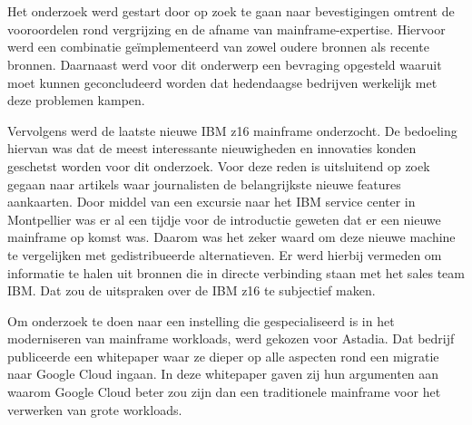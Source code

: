
\chapter{}
\label{ch:methodologie}



\section{}
\label{sec:De literatuur- en vergelijkende studie}

Het onderzoek werd gestart door op zoek te gaan naar bevestigingen omtrent de vooroordelen rond vergrijzing en de afname van mainframe-expertise. Hiervoor werd een combinatie geïmplementeerd van zowel oudere bronnen als recente bronnen. Daarnaast werd voor dit onderwerp een bevraging opgesteld waaruit moet kunnen geconcludeerd worden dat hedendaagse bedrijven werkelijk met deze problemen kampen. 

Vervolgens werd de laatste nieuwe IBM z16 mainframe onderzocht. De bedoeling hiervan was dat de meest interessante nieuwigheden en innovaties konden geschetst worden voor dit onderzoek. Voor deze reden is uitsluitend op zoek gegaan naar artikels waar journalisten de belangrijkste nieuwe features aankaarten. Door middel van een excursie naar het IBM service center in Montpellier was er al een tijdje voor de introductie geweten dat er een nieuwe mainframe op komst was. Daarom was het zeker waard om deze nieuwe machine te vergelijken met gedistribueerde alternatieven. Er werd hierbij vermeden om informatie te halen uit bronnen die in directe verbinding staan met het sales team IBM. Dat zou de uitspraken over de IBM z16 te subjectief maken. 

Om onderzoek te doen naar een instelling die gespecialiseerd is in het moderniseren van mainframe workloads, werd gekozen voor Astadia. Dat bedrijf publiceerde een whitepaper waar ze dieper op alle aspecten rond een migratie naar Google Cloud ingaan. In deze whitepaper gaven zij hun argumenten aan waarom Google Cloud beter zou zijn dan een traditionele mainframe voor het verwerken van grote workloads. 


